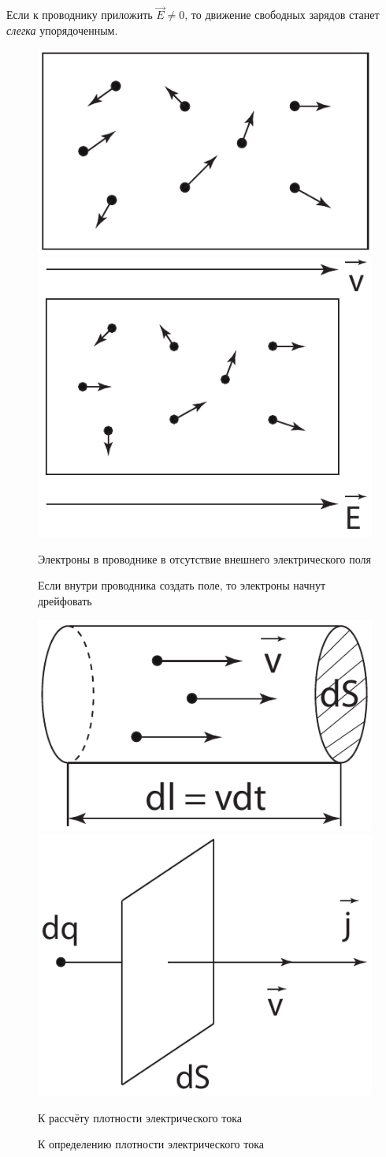     Если к проводнику приложить \( \vec{E} \ne 0 \), то движение свободных
    зарядов станет \textit{слегка} упорядоченным.
    \begin{figure}[t!]
        \center
        \includegraphics[width=.47\textwidth]{lec06/thermal_motion.pdf}
        \hfill
        \includegraphics[width=.47\textwidth]{lec06/drift.pdf}
        \parbox[t]{.47\textwidth}{\caption{Электроны в проводнике в отсутствие
        внешнего электрического поля}}
        \hfill
        \parbox[t]{.47\textwidth}{\caption{Если внутри проводника создать поле,
        то электроны начнут дрейфовать}}
    \end{figure}
    \begin{figure}[b!]
        \center
        \includegraphics[width=.47\textwidth]{lec06/density_calc.pdf}
        \hfill
        \includegraphics[width=.47\textwidth]{lec06/density_def.pdf}
        \parbox[t]{.47\textwidth}{\caption{К рассчёту плотности электрического
        тока}}
        \hfill
        \parbox[t]{.47\textwidth}{\caption{К определению плотности
        электрического тока}}
    \end{figure}
